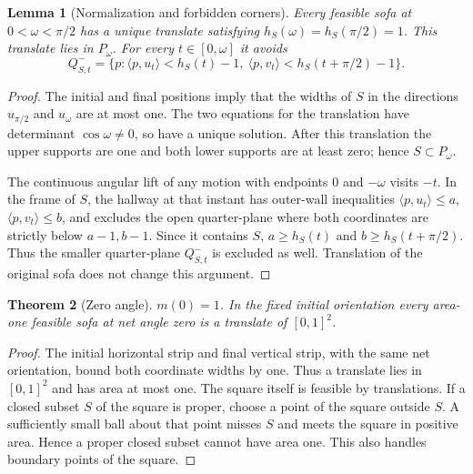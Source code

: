 \documentclass[11pt]{article}
\newtheorem{theorem}{Theorem}[section]
\newtheorem{lemma}[theorem]{Lemma}
\theoremstyle{remark}\newtheorem{remark}[theorem]{Remark}
\newcommand{\ip}[2]{\langle #1,#2\rangle}
\begin{document}
\begin{lemma}[Normalization and forbidden corners]\label{lem:normal}
Every feasible sofa at $0<\omega<\pi/2$ has a unique translate satisfying $h_S(\omega)=h_S(\pi/2)=1$. This translate lies in $P_\omega$. For every $t\in[0,\omega]$ it avoids
\[
 Q^-_{S,t}=\{p:\ip p{u_t}<h_S(t)-1,\ \ip p{v_t}<h_S(t+\pi/2)-1\}.
\]
\end{lemma}
\begin{proof}
The initial and final positions imply that the widths of $S$ in the directions $u_{\pi/2}$ and $u_\omega$ are at most one. The two equations for the translation have determinant $\cos\omega\ne0$, so have a unique solution. After this translation the upper supports are one and both lower supports are at least zero; hence $S\subset P_\omega$.

The continuous angular lift of any motion with endpoints $0$ and $-\omega$ visits $-t$. In the frame of $S$, the hallway at that instant has outer-wall inequalities $\ip p{u_t}\le a$, $\ip p{v_t}\le b$, and excludes the open quarter-plane where both coordinates are strictly below $a-1,b-1$. Since it contains $S$, $a\ge h_S(t)$ and $b\ge h_S(t+\pi/2)$. Thus the smaller quarter-plane $Q^-_{S,t}$ is excluded as well. Translation of the original sofa does not change this argument.
\end{proof}

\begin{theorem}[Zero angle]\label{thm:zero}
$m(0)=1$. In the fixed initial orientation every area-one feasible sofa at net angle zero is a translate of $[0,1]^2$.
\end{theorem}
\begin{proof}
The initial horizontal strip and final vertical strip, with the same net orientation, bound both coordinate widths by one. Thus a translate lies in $[0,1]^2$ and has area at most one. The square itself is feasible by translations. If a closed subset $S$ of the square is proper, choose a point of the square outside $S$. A sufficiently small ball about that point misses $S$ and meets the square in positive area. Hence a proper closed subset cannot have area one. This also handles boundary points of the square.
\end{proof}
\end{document}
